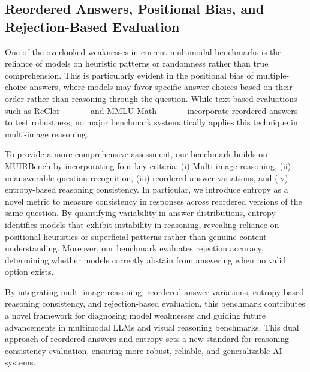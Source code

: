 \subsection{Reordered Answers, Positional Bias, and Rejection-Based Evaluation}
One of the overlooked weaknesses in current multimodal benchmarks is the reliance of models on heuristic patterns or randomness rather than true comprehension. This is particularly evident in the positional bias of multiple-choice answers, where models may favor specific answer choices based on their order rather than reasoning through the question. While text-based evaluations such as ReClor ____ and MMLU-Math ____ incorporate reordered answers to test robustness, no major benchmark systematically applies this technique in multi-image reasoning.


To provide a more comprehensive assessment, our benchmark builds on MUIRBench by incorporating four key criteria: (i) Multi-image reasoning, (ii) unanswerable question recognition, (iii) reordered answer variations, and (iv) entropy-based reasoning consistency. In particular, we introduce entropy as a novel metric to measure consistency in responses across reordered versions of the same question. By quantifying variability in answer distributions, entropy identifies models that exhibit instability in reasoning, revealing reliance on positional heuristics or superficial patterns rather than genuine content understanding. Moreover, our benchmark evaluates rejection accuracy, determining whether models correctly abstain from answering when no valid option exists.

By integrating multi-image reasoning, reordered answer variations, entropy-based reasoning consistency, and rejection-based evaluation, this benchmark contributes a novel framework for diagnosing model weaknesses and guiding future advancements in multimodal LLMs and visual reasoning benchmarks. This dual approach of reordered answers and entropy sets a new standard for reasoning consistency evaluation, ensuring more robust, reliable, and generalizable AI systems.